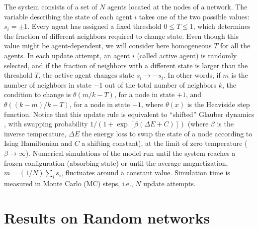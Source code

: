 The system consists of a set of $N$ agents located at the nodes of a network. The variable describing the state of each agent $i$ takes one of the two possible values: $s_i = \pm 1$. Every agent has assigned a fixed threshold $0 \leq T \leq 1$, which determines the fraction of different neighbors required to change state. Even though this value might be agent-dependent, we will consider here homogeneous $T$ for all the agents. In each update attempt, an agent $i$ (called active agent) is randomly selected, and if the fraction of neighbors with a different state is larger than the threshold $T$, the active agent changes state $s_i \to -s_i$. In other words, if $m$ is the number of neighbors in state $-1$ out of the total number of neighbors $k$, the condition to change is $\theta(m/k - T)$, for a node in state $+1$, and $\theta((k-m)/k - T)$, for a node in state $-1$, where $\theta(x)$ is the Heaviside step function. Notice that this update rule is equivalent to ``shifted'' Glauber dynamics \cite{glauber1963time}, with swapping probability $1/(1+\exp[\beta(\Delta E + C)])$ (where $\beta$ is the inverse temperature, $\Delta E$ the energy loss to swap the state of a node according to Ising Hamiltonian and $C$ a shifting constant), at the limit of zero temperature ($\beta \to \infty$). Numerical simulations of the model run until the system reaches a frozen configuration (absorbing state) or until the average magnetization, $m = (1/N) \sum_i s_i$, fluctuates around a constant value.   Simulation time is measured in Monte Carlo (MC) steps, i.e., $N$ update attempts. 

\section{\label{sec:Results on Complex networks} Results on Random networks}


